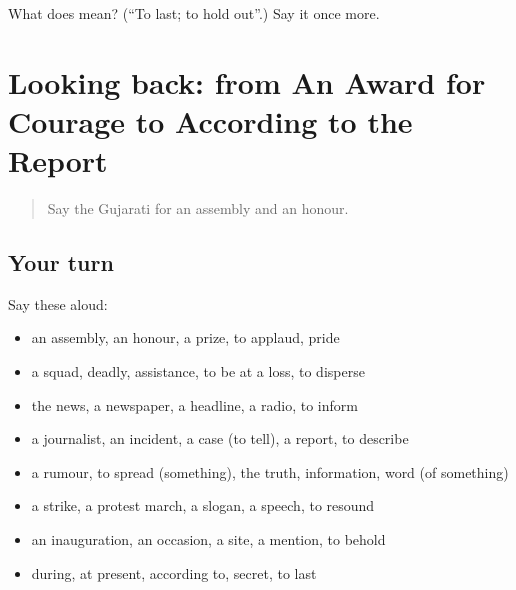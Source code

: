 \begin{tcolorbox}[breakable,colback=teal!4,colframe=teal!35!black,title={Before you move on}]
What does  mean? (\textquotedblleft{}To last; to hold out\textquotedblright{}.) Say it once more.
\end{tcolorbox}
\section[(dialogue)]{Looking back: from An Award for Courage to According to the Report}

\label{lesson:GU-R316-review-309-316}



\begin{quote}
Say the Gujarati for an assembly and an honour.
\end{quote}

\subsection*{Your turn}
Say these aloud:

\begin{itemize}
\raggedright
  \item an assembly, an honour, a prize, to applaud, pride
  \item a squad, deadly, assistance, to be at a loss, to disperse
  \item the news, a newspaper, a headline, a radio, to inform
  \item a journalist, an incident, a case (to tell), a report, to describe
  \item a rumour, to spread (something), the truth, information, word (of something)
  \item a strike, a protest march, a slogan, a speech, to resound
  \item an inauguration, an occasion, a site, a mention, to behold
  \item during, at present, according to, secret, to last
\end{itemize}

